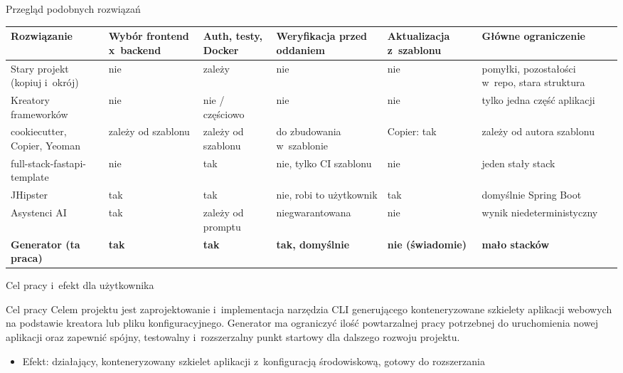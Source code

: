 \documentclass[aspectratio=169, 11pt]{beamer}
\newcommand{\rowrule}{\specialrule{0.3pt}{1.5pt}{1.5pt}}
\begin{document}
\begin{frame}{Przegląd podobnych rozwiązań}
  \scriptsize
  \setlength{\tabcolsep}{3pt}
  \begin{adjustbox}{max width=1.08\textwidth, max totalheight=0.85\textheight, center}
  \begin{tabularx}{1.08\textwidth}{>{\raggedright\arraybackslash}p{2.5cm} *{4}{>{\centering\arraybackslash}X} >{\raggedright\arraybackslash}p{3.0cm}}
    \toprule
    Rozwiązanie & Wybór frontend x~backend & Auth, testy, Docker & Weryfikacja przed oddaniem & Aktualizacja z~szablonu & Główne ograniczenie \\
    \midrule
    Stary projekt (kopiuj i~okrój) & nie & zależy & nie & nie & pomyłki, pozostałości w~repo, stara struktura \\
    \rowrule
    Kreatory frameworków & nie & nie / częściowo & nie & nie & tylko jedna część aplikacji \\
    \rowrule
    cookiecutter, Copier, Yeoman & zależy od szablonu & zależy od szablonu & do zbudowania w~szablonie & Copier: tak & zależy od autora szablonu \\
    \rowrule
    full-stack-fastapi-template & nie & tak & nie, tylko CI szablonu & nie & jeden stały stack \\
    \rowrule
    JHipster & tak & tak & nie, robi to użytkownik & tak & domyślnie Spring Boot \\
    \rowrule
    Asystenci AI & tak & zależy od promptu & niegwarantowana & nie & wynik niedeterministyczny \\
    \midrule
    \textbf{Generator (ta praca)} & \textbf{tak} & \textbf{tak} & \textbf{tak, domyślnie} & \textbf{nie (świadomie)} & \textbf{mało stacków} \\
    \bottomrule
  \end{tabularx}
  \end{adjustbox}
\end{frame}

\begin{frame}{Cel pracy i~efekt dla użytkownika}
  \begin{block}{Cel pracy}
    \vspace{2mm}
    Celem projektu jest zaprojektowanie i~implementacja narzędzia CLI generującego konteneryzowane szkielety aplikacji webowych na podstawie kreatora lub pliku konfiguracyjnego. Generator ma ograniczyć ilość powtarzalnej pracy potrzebnej do uruchomienia nowej aplikacji oraz zapewnić spójny, testowalny i~rozszerzalny punkt startowy dla dalszego rozwoju projektu.
  \end{block}
  \begin{itemize}
    \item Efekt: działający, konteneryzowany szkielet aplikacji z~konfiguracją środowiskową, gotowy do rozszerzania
  \end{itemize}
\end{frame}
\end{document}
